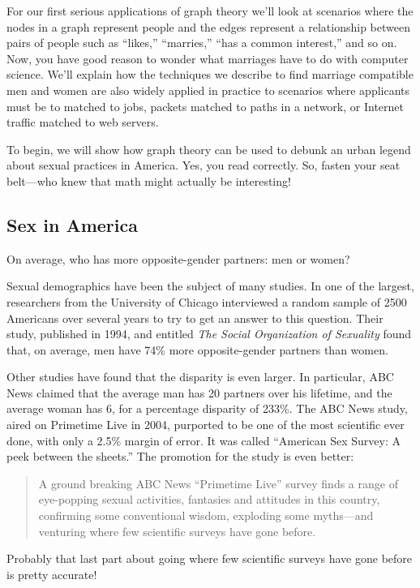 For our first serious applications of graph theory we'll look at scenarios
where the nodes in a graph represent people and the edges represent a
relationship between pairs of people such as ``likes,'' ``marries,'' ``has
a common interest,'' and so on.  Now, you have good reason to wonder what
marriages have to do with computer science.  We'll explain how the
techniques we describe to find marriage compatible men and women are
also widely applied in practice to scenarios where applicants must be to
matched to jobs, packets matched to paths in a network, or Internet
traffic matched to web servers.  

To begin, we will show how graph theory can be used to debunk an urban
legend about sexual practices in America.  Yes, you read correctly.  So,
fasten your seat belt---who knew that math might actually be interesting!

\subsection{Sex in America}

On average, who has more opposite-gender partners: men or women?

Sexual demographics have been the subject of many studies.  In one of the
largest, researchers from the University of Chicago interviewed a random
sample of 2500 Americans over several years to try to get an answer to this
question.  Their study, published in 1994, and entitled \emph{The Social
  Organization of Sexuality} found that, on average, men have 74\% more
opposite-gender partners than women.

Other studies have found that the disparity is even larger.  In
particular, ABC News claimed that the average man has 20 partners over his
lifetime, and the average woman has 6, for a percentage disparity of
233\%.  The ABC News study, aired on Primetime Live in 2004, purported to
be one of the most scientific ever done, with only a 2.5\% margin of
error.  It was called ``American Sex Survey: A peek between the sheets.''
The promotion for the study is even better:
\begin{quote}
A ground breaking ABC News ``Primetime Live'' survey finds a range of
eye-popping sexual activities, fantasies and attitudes in this country,
confirming some conventional wisdom, exploding some myths---and venturing
where few scientific surveys have gone before.
\end{quote}
Probably that last part about going where few scientific surveys have gone
before is pretty accurate!

